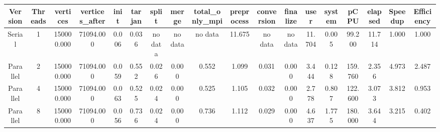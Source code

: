 \begin{tabular}{|c|c|c|c|c|c|c|c|c|c|c|c|c|c|c|c|c|c|}
\toprule
 Version &  Threads &   vertices &  vertices\_after &  init &  tarjan &   split &   merge & total\_only\_mpi &  preprocess & conversion & finalize &   user &  system &    pCPU &  elapsed &  Speedup &  Efficiency \\
\midrule
  Serial &        1 & 150000.000 &       71094.000 & 0.006 &   0.036 & no data & no data &        no data &      11.675 &    no data &  no data & 11.704 &   0.005 &  99.200 &   11.714 &    1.000 &       1.000 \\
Parallel &        2 & 150000.000 &       71094.000 & 0.059 &   0.552 &   0.026 &   0.000 &          0.552 &       1.099 &      0.031 &    0.000 &  3.444 &   0.128 & 159.760 &    2.356 &    4.973 &       2.487 \\
Parallel &        4 & 150000.000 &       71094.000 & 0.063 &   0.525 &   0.024 &   0.000 &          0.525 &       1.105 &      0.032 &    0.000 &  2.778 &   0.807 & 122.600 &    3.073 &    3.812 &       0.953 \\
Parallel &        8 & 150000.000 &       71094.000 & 0.056 &   0.736 &   0.024 &   0.000 &          0.736 &       1.112 &      0.029 &    0.000 &  4.637 &   1.775 & 180.000 &    3.644 &    3.215 &       0.402 \\
\bottomrule
\end{tabular}
